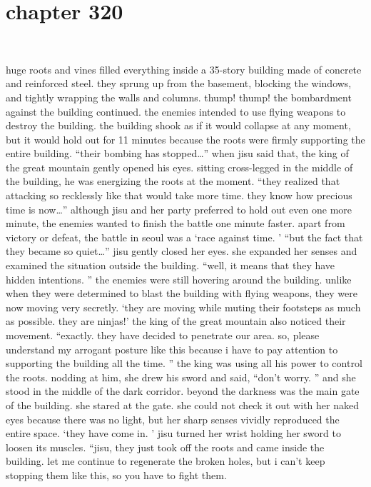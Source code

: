 \section{chapter 320}

                             




huge roots and vines filled everything inside a 35-story building made of concrete and reinforced steel.
 they sprung up from the basement, blocking the windows, and tightly wrapping the walls and columns.
 thump! thump! the bombardment against the building continued.
 the enemies intended to use flying weapons to destroy the building.
 the building shook as if it would collapse at any moment, but it would hold out for 11 minutes because the roots were firmly supporting the entire building.
 “their bombing has stopped…” when jisu said that, the king of the great mountain gently opened his eyes.
 sitting cross-legged in the middle of the building, he was energizing the roots at the moment.
 “they realized that attacking so recklessly like that would take more time.
 they know how precious time is now…” although jisu and her party preferred to hold out even one more minute, the enemies wanted to finish the battle one minute faster.
 apart from victory or defeat, the battle in seoul was a ‘race against time.
’ “but the fact that they became so quiet…” jisu gently closed her eyes.
 she expanded her senses and examined the situation outside the building.
 “well, it means that they have hidden intentions.
” the enemies were still hovering around the building.
 unlike when they were determined to blast the building with flying weapons, they were now moving very secretly.
 ‘they are moving while muting their footsteps as much as possible.
 they are ninjas!’ the king of the great mountain also noticed their movement.
 “exactly.
 they have decided to penetrate our area.
 so, please understand my arrogant posture like this because i have to pay attention to supporting the building all the time.
” the king was using all his power to control the roots.
 nodding at him, she drew his sword and said, “don’t worry.
” and she stood in the middle of the dark corridor.
 beyond the darkness was the main gate of the building.
 she stared at the gate.
 she could not check it out with her naked eyes because there was no light, but her sharp senses vividly reproduced the entire space.
 ‘they have come in.
’ jisu turned her wrist holding her sword to loosen its muscles.
 “jisu, they just took off the roots and came inside the building.
 let me continue to regenerate the broken holes, but i can’t keep stopping them like this, so you have to fight them.
